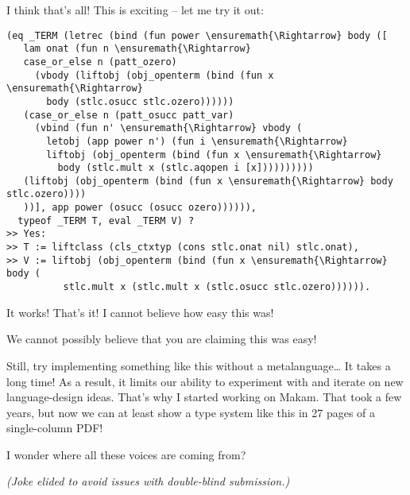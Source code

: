 \heroSTUDENT{} I think that's all! This is exciting -- let me try it out:

\begin{verbatim}
(eq _TERM (letrec (bind (fun power \ensuremath{\Rightarrow} body ([
   lam onat (fun n \ensuremath{\Rightarrow}
   case_or_else n (patt_ozero)
     (vbody (liftobj (obj_openterm (bind (fun x \ensuremath{\Rightarrow}
       body (stlc.osucc stlc.ozero))))))
   (case_or_else n (patt_osucc patt_var)
     (vbind (fun n' \ensuremath{\Rightarrow} vbody (
       letobj (app power n') (fun i \ensuremath{\Rightarrow}
       liftobj (obj_openterm (bind (fun x \ensuremath{\Rightarrow}
         body (stlc.mult x (stlc.aqopen i [x])))))))))
   (liftobj (obj_openterm (bind (fun x \ensuremath{\Rightarrow} body stlc.ozero))))
   ))], app power (osucc (osucc ozero)))))),
  typeof _TERM T, eval _TERM V) ?
>> Yes:
>> T := liftclass (cls_ctxtyp (cons stlc.onat nil) stlc.onat),
>> V := liftobj (obj_openterm (bind (fun x \ensuremath{\Rightarrow} body (
          stlc.mult x (stlc.mult x (stlc.osucc stlc.ozero)))))).
\end{verbatim}

\noindent
It works! That's it! I cannot believe how easy this was!

\heroAUDIENCE{} We cannot possibly believe that you are claiming this was
easy!

\heroAUTHOR{} Still, try implementing something like this without a
metalanguage\ldots{} It takes a long time! As a result, it limits our
ability to experiment with and iterate on new language-design ideas.
That's why I started working on Makam. That took a few years, but now we
can at least show a type system like this in 27 pages of a single-column
PDF!

\heroADVISOR{} I wonder where all these voices are coming from?

\heroSTUDENT{}
\textit{(Joke elided to avoid issues with double-blind submission.)}
